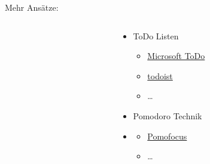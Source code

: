 \begin{frame}{Mehr Ansätze:}
\begin{columns}[t]
\begin{column}{0.3\textwidth}
        \end{column}
        \begin{column}{0.7\textwidth}
            \begin{itemize}
                \item ToDo Listen
                \begin{itemize}
                    \item \href{https://to-do.office.com/tasks/}{Microsoft ToDo}
                    \item \href{https://todoist.com/de}{todoist}
                    \item \dots
                \end{itemize}
                \item Pomodoro Technik
                \item \begin{itemize}
                    \item \href{https://pomofocus.io/}{Pomofocus}
                    \item \dots
                \end{itemize}                 
            \end{itemize}
        \end{column}
    \end{columns}
\end{frame}


